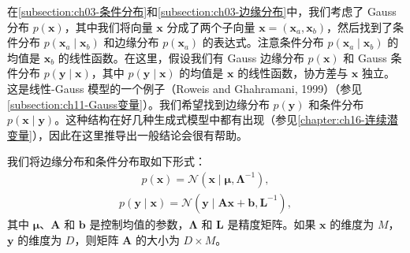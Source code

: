 \documentclass[../../main.tex]{subfiles}
\begin{document}
在\cref{subsection:ch03-条件分布}和\cref{subsection:ch03-边缘分布}中，我们考虑了 Gauss 分布 $p(\boldsymbol{x})$，其中我们将向量 $\boldsymbol{x}$ 分成了两个子向量 $\boldsymbol{x}=(\boldsymbol{x}_{a},\boldsymbol{x}_{b})$，然后找到了条件分布 $p(\boldsymbol{x}_{a}\mid\boldsymbol{x}_{b})$ 和边缘分布 $p(\boldsymbol{x}_{a})$ 的表达式。注意条件分布 $p(\boldsymbol{x}_{a}\mid\boldsymbol{x}_{b})$ 的均值是 $\boldsymbol{x}_{b}$ 的线性函数。在这里，假设我们有 Gauss 边缘分布 $p(\boldsymbol{x})$ 和 Gauss 条件分布 $p(\boldsymbol{y}\mid\boldsymbol{x})$，其中 $p(\boldsymbol{y}\mid\boldsymbol{x})$ 的均值是 $\boldsymbol{x}$ 的线性函数，协方差与 $\boldsymbol{x}$ 独立。这是线性-Gauss 模型的一个例子（Roweis and Ghahramani, 1999）（参见\cref{subsection:ch11-Gauss变量}）。我们希望找到边缘分布 $p(\boldsymbol{y})$ 和条件分布 $p(\boldsymbol{x}\mid\boldsymbol{y})$。这种结构在好几种生成式模型中都有出现（参见\cref{chapter:ch16-连续潜变量}），因此在这里推导出一般结论会很有帮助。

我们将边缘分布和条件分布取如下形式：
\begin{align}
p(\boldsymbol{x})=\mathcal{N}(\boldsymbol{x}\mid\boldsymbol{\mu},\boldsymbol{\Lambda}^{-1}),
\label{align:ch03-先验Gauss}
\end{align}
\begin{align}
p(\boldsymbol{y}\mid\boldsymbol{x})=\mathcal{N}(\boldsymbol{y}\mid\boldsymbol{A}\boldsymbol{x}+\boldsymbol{b},\boldsymbol{L}^{-1}),
\label{align:ch03-线性Gauss条件}
\end{align}
其中 $\boldsymbol{\mu}$、$\boldsymbol{A}$ 和 $\boldsymbol{b}$ 是控制均值的参数，$\boldsymbol{\Lambda}$ 和 $\boldsymbol{L}$ 是精度矩阵。如果 $\boldsymbol{x}$ 的维度为 $M$，$\boldsymbol{y}$ 的维度为 $D$，则矩阵 $\boldsymbol{A}$ 的大小为 $D\times M$。
\end{document}

